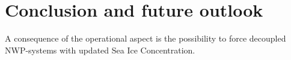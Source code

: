 \documentclass[../main/thesis.tex]{subfiles}
\begin{document}
\section{Conclusion and future outlook}



A consequence of the operational aspect is the possibility to force decoupled NWP-systems with updated Sea Ice Concentration.

\end{document}
